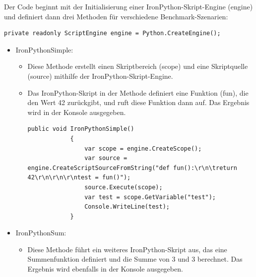 Der Code beginnt mit der Initialisierung einer IronPython-Skript-Engine (engine) und definiert dann drei Methoden für verschiedene Benchmark-Szenarien:

\begin{lstlisting}[language={[Sharp]C}, caption=IronPythonCreateEnginge, label=lst:imp:ipyEngine]
    private readonly ScriptEngine engine = Python.CreateEngine();
\end{lstlisting}
    

\begin{itemize}
    \item IronPythonSimple:
    \begin{itemize}
        \item Diese Methode erstellt einen Skriptbereich (scope) und eine Skriptquelle (source) mithilfe der IronPython-Skript-Engine.
        \item Das IronPython-Skript in der Methode definiert eine Funktion (fun), die den Wert 42 zurückgibt, und ruft diese Funktion dann auf. Das Ergebnis wird in der Konsole ausgegeben.
        \begin{lstlisting}[language={[Sharp]C}, caption=IronPythonSimple, label=lst:imp:ipySimple]    
            public void IronPythonSimple()
            {
                var scope = engine.CreateScope();
                var source = engine.CreateScriptSourceFromString("def fun():\r\n\treturn 42\r\n\r\n\r\ntest = fun()");
                source.Execute(scope);
                var test = scope.GetVariable("test");
                Console.WriteLine(test);
            }
        \end{lstlisting}
    \end{itemize}
    \item IronPythonSum:
    \begin{itemize}
        \item  Diese Methode führt ein weiteres IronPython-Skript aus, das eine Summenfunktion definiert und die Summe von 3 und 3 berechnet. Das Ergebnis wird ebenfalls in der Konsole ausgegeben.
        \begin{lstlisting}[language={[Sharp]C}, caption=IronPythonSum, label=lst:imp:ipySum]


\end{lstlisting}
\end{itemize}
\end{itemize}
